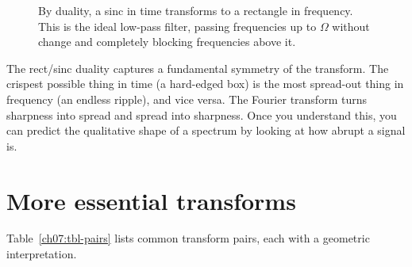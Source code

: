 \begin{figure}[H]
\centering
{}
\caption{By duality, a sinc in time transforms to a rectangle in frequency. This is the ideal low-pass filter, passing frequencies up to $\Omega$ without change and completely blocking frequencies above it.}
\label{ch07:fig-duality}
\end{figure}

\begin{aestheticbox}
The rect/sinc duality captures a fundamental symmetry of the transform. The crispest possible thing
in time (a hard-edged box) is the most spread-out thing in frequency (an endless ripple),
and vice versa. The Fourier transform turns sharpness into spread and spread into
sharpness. Once you understand this, you can predict the
qualitative shape of a spectrum by looking at how abrupt a signal is.
\end{aestheticbox}

\section{More essential transforms}
\label{ch07:more-pairs}

Table~\ref{ch07:tbl-pairs} lists common transform pairs, each with a geometric interpretation.

